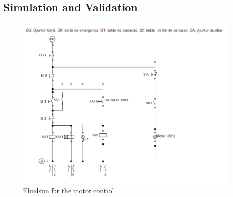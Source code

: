 \subsection{Simulation and Validation} \label{sec:Simulation_and_Validation}

\begin{figure}[H]
    \includegraphics[width=16cm]{Images/Q2/fluidsim.png}
    \centering
    \caption{Fluidsim for the motor control}
    \label{fig:fluidsim}
\end{figure}

